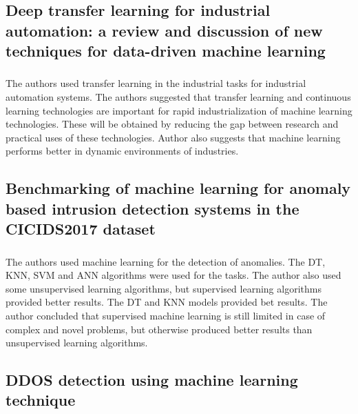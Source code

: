 \subsection{Deep transfer learning for industrial automation: a review and discussion of new techniques for data-driven machine learning}
\subsubsection{\citeauthor*{ref_paper_13} \citeyearpar{ref_paper_13}}

The authors used transfer learning in the industrial tasks for industrial automation systems. The authors suggested that transfer learning and continuous learning technologies are important for rapid industrialization of machine learning technologies. These will be obtained by reducing the gap between research and practical uses of these technologies. Author also suggests that machine learning performs better in dynamic environments of industries.

\subsection{Benchmarking of machine learning for anomaly based intrusion detection systems in the CICIDS2017 dataset}
\subsubsection{\citeauthor*{ref_paper_21} \citeyearpar{ref_paper_21}}

The authors used machine learning for the detection of anomalies. The DT, KNN, SVM and ANN algorithms were used for the tasks. The author also used some unsupervised learning algorithms, but supervised learning algorithms provided better results. The DT and KNN models provided bet results. The author concluded that supervised machine learning is still limited in case of complex and novel problems, but otherwise produced better results than unsupervised learning algorithms.

\subsection{DDOS detection using machine learning technique}
\subsubsection{\citeauthor*{ref_paper_9} \citeyearpar{ref_paper_9}}

